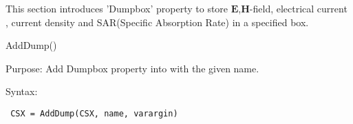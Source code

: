 This section introduces 'Dumpbox' property to store $\mathbf{E}$,$\mathbf{H}$-field, electrical current , current density and SAR(Specific Absorption Rate) in a specified box.  


\begin{FontNameFunct}{AddDump()}
\end{FontNameFunct}

\begin{FontDescr}{Purpose:}
Add Dumpbox property into 
\label{CSX} with the given name. 
\end{FontDescr}

\begin{FontDescr}{Syntax:}
\begin{lstlisting} 
 CSX = AddDump(CSX, name, varargin)
\end{lstlisting}
\end{FontDescr}

